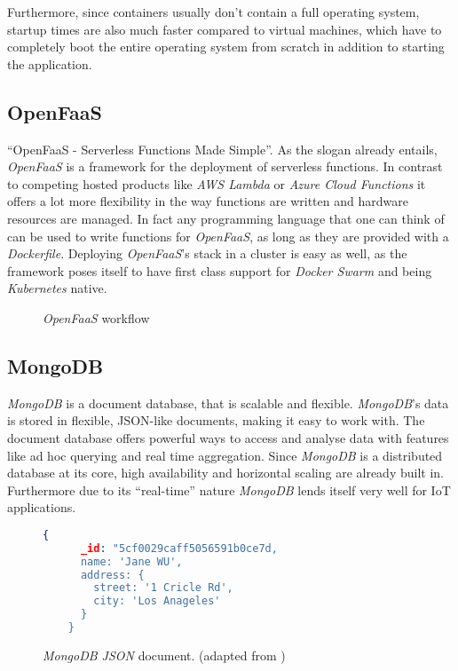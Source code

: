 Furthermore, since containers usually don't contain a full operating system, startup times are also
much faster compared to virtual machines, which have to completely boot the entire operating system
from scratch in addition to starting the application. \cite{docker-container}

\subsection{OpenFaaS}

“OpenFaaS - Serverless Functions Made Simple”. As the slogan already entails, \textit{OpenFaaS} is a
framework for the deployment of serverless functions. In contrast to competing hosted products like
\textit{AWS Lambda} or \textit{Azure Cloud Functions} it offers a lot more flexibility in the way
functions are written and hardware resources are managed. In fact any programming language that one
can think of can be used to write functions for \textit{OpenFaaS}, as long as they are provided with
a \textit{Dockerfile}. Deploying \textit{OpenFaaS}'s stack in a cluster is easy as well, as the
framework poses itself to have first class support for \textit{Docker Swarm} and being
\textit{Kubernetes} native. \cite{openfaas-docs}

\begin{figure}[H]
  \centering
  \caption{\textit{OpenFaaS} workflow \cite{openfaas-docs}}
\end{figure}

\subsection{MongoDB}

\textit{MongoDB} is a document database, that is scalable and flexible. \textit{MongoDB}'s data is
 stored in flexible, JSON-like documents, making it easy to work with. The document database offers
 powerful ways to access and analyse data with features like ad hoc querying and real time
 aggregation. Since \textit{MongoDB} is a distributed database at its core, high availability and
 horizontal scaling are already built in. Furthermore due to its “real-time” nature \textit{MongoDB}
 lends itself very well for IoT applications.  \cite{mongodb-description}

 \begin{figure}[H]
  \centering
  \begin{lstlisting}[language=Json, basicstyle=\small]
    {
      _id: "5cf0029caff5056591b0ce7d,
      name: 'Jane WU',
      address: {
        street: '1 Cricle Rd',
        city: 'Los Anageles'
      }
    }
  \end{lstlisting}
  \caption{\textit{MongoDB JSON} document. (adapted from \cite{mongodb-description})}
\end{figure}

